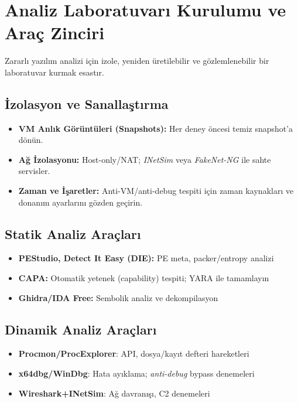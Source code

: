\section{Analiz Laboratuvarı Kurulumu ve Araç Zinciri}

Zararlı yazılım analizi için izole, yeniden üretilebilir ve gözlemlenebilir bir laboratuvar kurmak esastır.

\subsection{İzolasyon ve Sanallaştırma}
\begin{itemize}
  \item \textbf{VM Anlık Görüntüleri (Snapshots):} Her deney öncesi temiz snapshot'a dönün.
  \item \textbf{Ağ İzolasyonu:} Host-only/NAT; \textit{INetSim} veya \textit{FakeNet-NG} ile sahte servisler.
  \item \textbf{Zaman ve İşaretler:} Anti-VM/anti-debug tespiti için zaman kaynakları ve donanım ayarlarını gözden geçirin.
\end{itemize}

\subsection{Statik Analiz Araçları}
\begin{itemize}
  \item \textbf{PEStudio, Detect It Easy (DIE):} PE meta, packer/entropy analizi
  \item \textbf{CAPA:} Otomatik yetenek (capability) tespiti; YARA ile tamamlayın
  \item \textbf{Ghidra/IDA Free:} Sembolik analiz ve dekompilasyon
\end{itemize}

\subsection{Dinamik Analiz Araçları}
\begin{itemize}
  \item \textbf{Procmon/ProcExplorer}: API, dosya/kayıt defteri hareketleri
  \item \textbf{x64dbg/WinDbg}: Hata ayıklama; \textit{anti-debug} bypass denemeleri
  \item \textbf{Wireshark+INetSim}: Ağ davranışı, C2 denemeleri
\end{itemize}

